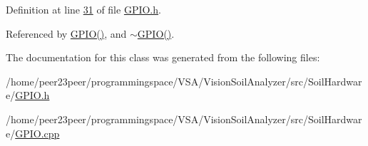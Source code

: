 Definition at line \hyperlink{_g_p_i_o_8h_source_l00031}{31} of file \hyperlink{_g_p_i_o_8h_source}{G\+P\+I\+O.\+h}.



Referenced by \hyperlink{_g_p_i_o_8cpp_source_l00011}{G\+P\+I\+O()}, and \hyperlink{_g_p_i_o_8cpp_source_l00024}{$\sim$\+G\+P\+I\+O()}.



The documentation for this class was generated from the following files\+:\begin{DoxyCompactItemize}
\item 
/home/peer23peer/programmingspace/\+V\+S\+A/\+Vision\+Soil\+Analyzer/src/\+Soil\+Hardware/\hyperlink{_g_p_i_o_8h}{G\+P\+I\+O.\+h}\item 
/home/peer23peer/programmingspace/\+V\+S\+A/\+Vision\+Soil\+Analyzer/src/\+Soil\+Hardware/\hyperlink{_g_p_i_o_8cpp}{G\+P\+I\+O.\+cpp}\end{DoxyCompactItemize}
